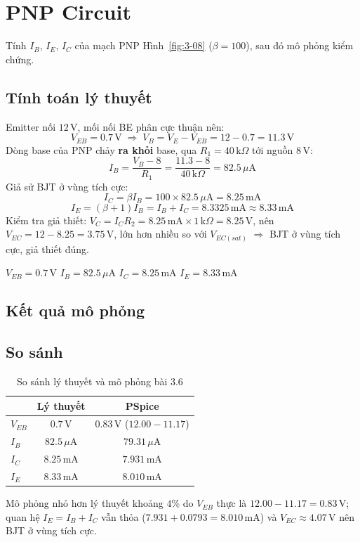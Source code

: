 \section{PNP Circuit}
Tính $I_B$, $I_E$, $I_C$ của mạch PNP Hình~\ref{fig:3-08} ($\beta = 100$), sau đó mô phỏng kiểm chứng.


\subsection{Tính toán lý thuyết}
Emitter nối $12\,\text{V}$, mối nối BE phân cực thuận nên:
\[ V_{EB} = 0.7\,\text{V} \;\Rightarrow\; V_B = V_E - V_{EB} = 12 - 0.7 = 11.3\,\text{V} \]
Dòng base của PNP chảy \textbf{ra khỏi} base, qua $R_1 = 40\,\text{k}\Omega$ tới nguồn $8\,\text{V}$:
\[ I_B = \frac{V_B - 8}{R_1} = \frac{11.3 - 8}{40\,\text{k}\Omega} = 82.5\,\mu\text{A} \]
Giả sử BJT ở vùng tích cực:
\[ I_C = \beta I_B = 100\times 82.5\,\mu\text{A} = 8.25\,\text{mA} \]
\[ I_E = (\beta + 1) I_B = I_B + I_C = 8.3325\,\text{mA} \approx 8.33\,\text{mA} \]
Kiểm tra giả thiết: $V_C = I_C R_2 = 8.25\,\text{mA}\times 1\,\text{k}\Omega = 8.25\,\text{V}$, nên $V_{EC} = 12 - 8.25 = 3.75\,\text{V}$, lớn hơn nhiều so với $V_{EC(sat)}$ $\Rightarrow$ BJT ở vùng tích cực, giả thiết đúng.

\begin{dapsobox}
$V_{EB} = 0.7\,\text{V}$ \quad $I_B = 82.5\,\mu\text{A}$ \quad $I_C = 8.25\,\text{mA}$ \quad $I_E = 8.33\,\text{mA}$
\end{dapsobox}

\subsection{Kết quả mô phỏng}

\subsection{So sánh}
\begin{table}[H]
\centering
\begin{tabular}{l|c|c}
\toprule
 & Lý thuyết & PSpice \\
\midrule
$V_{EB}$ & $0.7\,\text{V}$ & $0.83\,\text{V}$ ($12.00 - 11.17$) \\
$I_B$ & $82.5\,\mu\text{A}$ & $79.31\,\mu\text{A}$ \\
$I_C$ & $8.25\,\text{mA}$ & $7.931\,\text{mA}$ \\
$I_E$ & $8.33\,\text{mA}$ & $8.010\,\text{mA}$ \\
\bottomrule
\end{tabular}
\caption{So sánh lý thuyết và mô phỏng bài 3.6}
\end{table}
Mô phỏng nhỏ hơn lý thuyết khoảng $4\%$ do $V_{EB}$ thực là $12.00 - 11.17 = 0.83\,\text{V}$; quan hệ $I_E = I_B + I_C$ vẫn thỏa ($7.931 + 0.0793 = 8.010\,\text{mA}$) và $V_{EC} \approx 4.07\,\text{V}$ nên BJT ở vùng tích cực.
